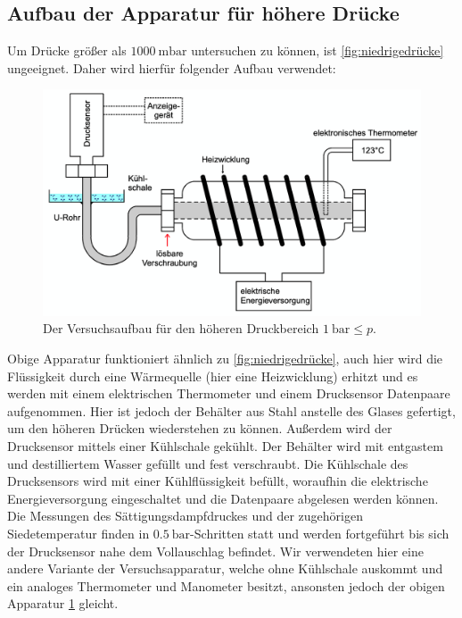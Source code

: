     \subsection{Aufbau der Apparatur für höhere Drücke}
    Um Drücke größer als $\SI{1000}{\milli\bar}$ untersuchen zu können, ist \ref{fig:niedrigedrücke} ungeeignet. Daher wird
    hierfür folgender Aufbau verwendet:
    \begin{figure}
      \centering
      \label{fig:hohedrücke}
      \includegraphics[scale=0.4]{Content/apparaturhohe.png}
      \caption{Der Versuchsaufbau für den höheren Druckbereich $\SI{1}{\bar} \leq p $.}
    \end{figure}
    Obige Apparatur funktioniert ähnlich zu \ref{fig:niedrigedrücke}, auch hier wird die Flüssigkeit durch eine Wärmequelle
    (hier eine Heizwicklung) erhitzt und es werden mit einem elektrischen Thermometer und einem Drucksensor Datenpaare
    aufgenommen. Hier ist jedoch der Behälter aus Stahl anstelle des Glases gefertigt, um den höheren Drücken wiederstehen zu
    können. Außerdem wird der Drucksensor mittels einer Kühlschale gekühlt. Der Behälter wird mit entgastem und destilliertem
    Wasser gefüllt und fest verschraubt. Die Kühlschale des Drucksensors wird mit einer Kühlflüssigkeit befüllt, woraufhin die
    elektrische Energieversorgung eingeschaltet und die Datenpaare abgelesen werden können. Die Messungen des
    Sättigungsdampfdruckes und der zugehörigen Siedetemperatur finden in $\SI{0.5}{\bar}$-Schritten statt und werden fortgeführt
    bis sich der Drucksensor nahe dem Vollauschlag befindet. Wir verwendeten hier eine andere Variante der Versuchsapparatur,
    welche ohne Kühlschale auskommt und ein analoges Thermometer und Manometer besitzt, ansonsten jedoch der obigen Apparatur
    \ref{fig:hohedrücke} gleicht.
\label{sec:Durchführung}
